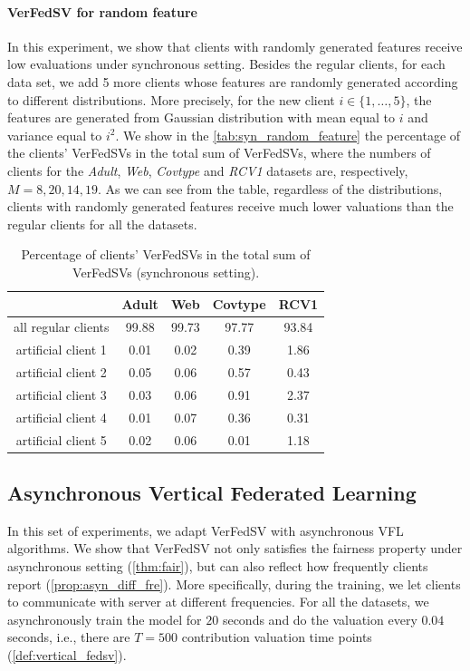 \paragraph{VerFedSV for random feature}
In this experiment, we show that clients with randomly generated features receive low evaluations under synchronous setting. Besides the regular clients, for each data set, we add 5 more clients whose features are randomly generated according to different distributions. More precisely, for the new client $i \in \{1,\dots,5\}$, the features are generated from Gaussian distribution with mean equal to $i$ and variance equal to $i^2$. We show in the \autoref{tab:syn_random_feature} the percentage of the clients' VerFedSVs in the total sum of VerFedSVs, where the numbers of clients for the \emph{Adult}, \emph{Web}, \emph{Covtype} and \emph{RCV1} datasets are, respectively, $M = 8, 20, 14, 19$. As we can see from the table, regardless of the distributions, clients with randomly generated features receive much lower valuations than the regular clients for all the datasets. 
\begin{table}[t]
    \centering
    \begin{tabular}{ccccc}
    \toprule
                         & Adult & Web   & Covtype  & RCV1 \\ \midrule
     all regular clients & 99.88 & 99.73 & 97.77    & 93.84\\
     artificial client 1 & 0.01  & 0.02  & 0.39     & 1.86 \\
     artificial client 2 & 0.05  & 0.06  & 0.57     & 0.43\\
     artificial client 3 & 0.03  & 0.06  & 0.91     & 2.37\\
     artificial client 4 & 0.01  & 0.07  & 0.36     & 0.31\\
     artificial client 5 & 0.02  & 0.06  & 0.01     & 1.18\\
    \bottomrule
    \end{tabular}
    \caption{Percentage of clients' VerFedSVs in the total sum of VerFedSVs (synchronous setting).}
    \label{tab:syn_random_feature}
\end{table}

\subsection{Asynchronous Vertical Federated Learning} \label{sec:8-8-3}
In this set of experiments, we adapt VerFedSV with asynchronous VFL algorithms. We show that VerFedSV not only satisfies the fairness property under asynchronous setting (\autoref{thm:fair}), but can also reflect how frequently clients report (\autoref{prop:asyn_diff_fre}). More specifically, during the training, we let clients to communicate with server at different frequencies. For all the datasets, we asynchronously train the model for $20$ seconds and do the valuation every $0.04$ seconds, i.e., there are $T = 500$ contribution valuation time points (\autoref{def:vertical_fedsv}). 

